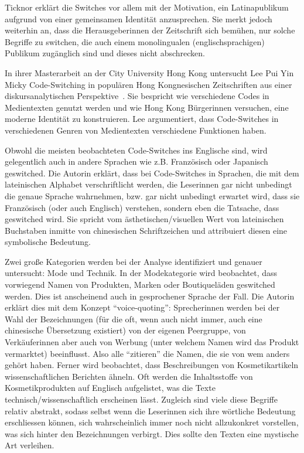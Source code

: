 Ticknor erklärt die Switches vor allem mit der Motivation, ein Latinapublikum aufgrund von einer gemeinsamen Identität anzusprechen.
Sie merkt jedoch weiterhin an, dass die Herausgeberinnen der Zeitschrift sich bemühen, nur solche Begriffe zu switchen, die auch einem monolingualen (englischsprachigen) Publikum zugänglich sind und dieses nicht abschrecken.



In ihrer Masterarbeit an der City University Hong Kong untersucht Lee Pui Yin Micky Code-Switching in populären Hong Kongnesischen Zeitschriften aus einer diskursanalytischen Perspektive~\cite[]{Lee99}.
Sie bespricht wie verschiedene Codes in Medientexten genutzt werden und wie Hong Kong Bürgerinnen versuchen, eine moderne Identität zu konstruieren.
Lee argumentiert, dass Code-Switches in verschiedenen Genren von Medientexten verschiedene Funktionen haben.

Obwohl die meisten beobachteten Code-Switches ins Englische sind, wird gelegentlich auch in andere Sprachen wie z.B. Französisch oder Japanisch geswitched.
Die Autorin erklärt, dass bei Code-Switches in Sprachen, die mit dem lateinischen Alphabet verschriftlicht werden, die Leserinnen gar nicht unbedingt die genaue Sprache wahrnehmen, bzw. gar nicht unbedingt erwartet wird, dass sie Französisch (oder auch Englisch) verstehen, sondern eben die Tatsache, dass geswitched wird.
Sie spricht vom ästhetischen/visuellen Wert von lateinischen Buchstaben inmitte von chinesischen Schriftzeichen und attribuiert diesen eine symbolische Bedeutung.

Zwei große Kategorien werden bei der Analyse identifiziert und genauer untersucht: Mode und Technik.
In der Modekategorie wird beobachtet, dass vorwiegend Namen von Produkten, Marken oder Boutiqueläden geswitched werden.
Dies ist anscheinend auch in gesprochener Sprache der Fall.
Die Autorin erklärt dies mit dem Konzept ``voice-quoting'': Sprecherinnen werden bei der Wahl der Bezeichnungen (für die oft, wenn auch nicht immer, auch eine chinesische Übersetzung existiert) von der eigenen Peergruppe, von Verkäuferinnen aber auch von Werbung (unter welchem Namen wird das Produkt vermarktet) beeinflusst.
Also alle ``zitieren'' die Namen, die sie von wem anders gehört haben.
Ferner wird beobachtet, dass Beschreibungen von Kosmetikartikeln wissenschaftlichen Berichten ähneln.
Oft werden die Inhaltsstoffe von Kosmetikprodukten auf Englisch aufgelistet, was die Texte technisch/wissenschaftlich erscheinen lässt.
Zugleich sind viele diese Begriffe relativ abstrakt, sodass selbst wenn die Leserinnen sich ihre wörtliche Bedeutung erschliessen können, sich wahrscheinlich immer noch nicht allzukonkret vorstellen, was sich hinter den Bezeichnungen verbirgt.
Dies sollte den Texten eine mystische Art verleihen.

